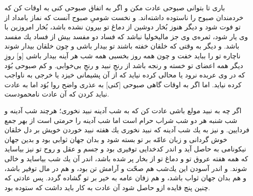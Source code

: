 بارى تا بتوانى صبوحى عادت مكن و اگر به اتفاق صبوحى كنى به اوقات كن كه خردمندان صبوح را ناستوده داشته‌اند. و نخست شومىِ صبوح آنست كه نماز بامداد از تو فوت شود و ديگر هنوز بُخار دوشين از دماغ تو بيرون نشده باشد، بُخار امروزين با وى يار شود، ثمره‌ی وى جز ماليخوليا نباشد كه فساد دو مفسد بيش از فساد يك مفسد باشد. و ديگر به وقتى كه خلقان خفته باشند تو بيدار باشى و چون خلقان بيدار شوند ناچاره تو را ببايد خفت و چون همه روز بخسبى همه شب هر آينه بيدار باشى [و] روزِ ديگر همه اعضاى تو خسته و رنجه باشد از رنجِ نبيد و رنجِ بى‌خوابى. و كم صبوحى بُوَد كه در وى عربده نرود يا محالى كرده نيايد كه از آن پشيمانى خيزد يا خرجى به ناواجب كرده نيايد. اما اگر به اوقات گاهى صبوحى [كنى] به عذرى واضح روا بُوَد اما به عادت نبايد كردن كه آن عادت نامحمودست.

اگر چه به نبيد مولع باشى عادت كن كه به شب آدينه نبيد نخورى؛ هرچند شب آدينه و شب شنبه هر دو شب شراب حرام است اما شب آدينه را حرمتى است از بهر جمع فردايين. و نيز به يك شب آدينه كه نبيد نخورى يك هفته نبيد خوردن خويش بر دل خلقان خوش گردانى و زبان عامّه بر تو بسته شود و بدان جهان ثوابى بود و بدين جهان نيكونامى به حاصل آيد و اندر كدخدايى توفيرى بود و جسم و عقل و روح تو نيز بياسايد كه همه هفته عروق تو و دماغ تو از بخار پر شده باشد، اندر آن يك شب بياسايد و خالى شوند. و اندر آسودن اين يك‌شب هم صحّت و آرامش تن بود، و هم در مال توفير باشد، و هم بدان جهان ثواب باشد، و هم زفان عامه به خير بر تو گشاده گردد. پس عادتى كه چنين پنج فايده ازو حاصل شود آن عادت به كار بايد داشت كه ستوده بود.

\newpage
